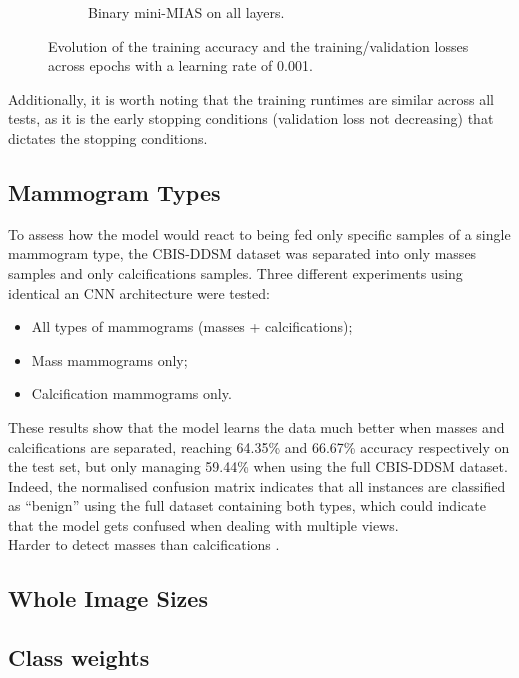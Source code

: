 \begin{figure}[h]
\begin{subfigure}{.5\textwidth}
  \caption{Binary mini-MIAS on all layers.}
  \label{fig:evaluation-individual-TL-all}
\end{subfigure}
\caption{\label{fig:evaluation-individual-TL-training}Evolution of the training accuracy and the training/validation losses across epochs with a learning rate of 0.001.}
\end{figure}

Additionally, it is worth noting that the training runtimes are similar across all tests, as it is the early stopping conditions (validation loss not decreasing) that dictates the stopping conditions.

\subsection{Mammogram Types}

To assess how the model would react to being fed only specific samples of a single mammogram type, the CBIS-DDSM dataset was separated into only masses samples and only calcifications samples. Three different experiments using identical an CNN architecture were tested:
\begin{itemize}
    \item All types of mammograms (masses + calcifications);
    \item Mass mammograms only;
    \item Calcification mammograms only.
\end{itemize}




These results show that the model learns the data much better when masses and calcifications are separated, reaching 64.35\% and 66.67\% accuracy respectively on the test set, but only managing 59.44\% when using the full CBIS-DDSM dataset. Indeed, the normalised confusion matrix indicates that all instances are classified as ``benign'' using the full dataset containing both types, which could indicate that the model gets confused when dealing with multiple views.\\

Harder to detect masses than calcifications \citep{Elter2009}.


\subsection{Whole Image Sizes}




\subsection{Class weights}


